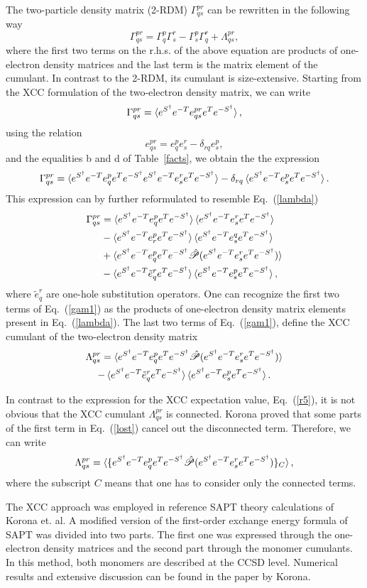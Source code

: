 \documentclass[preprint,12pt]{elsarticle}
\newcommand{\equ}[1]{\begin{equation} #1 \end{equation}}
\newcommand{\equl}[2]{\begin{equation}\label{#2} #1 \end{equation}}
\newcommand{\equml}[2]{\begin{multline}\label{#2} #1 \end{multline}}
\newcommand{\equsl}[2]{\begin{equation}\begin{split}\label{#2} #1 \end{split}\end{equation}}
\newcommand{\fr}[1]{Eq.~(\ref{#1})}
\newcommand{\Frt}[1]{Table~\ref{#1}}
\newcommand{\esd}{e^{S^\dagger}}
\newcommand{\esdm}{e^{-S^\dagger}}
\newcommand{\etm}{e^{-T}}
\newcommand{\et}{e^{T}}
\begin{document}
The two-particle density matrix (2-RDM)  $\Gamma^{pr}_{qs}$ can be rewritten in the following way \cite{kutzelnigg1997normal}
\equl{\Gamma^{pr}_{qs} =     \Gamma^p_q\Gamma^r_s - \Gamma^p_s\Gamma^r_q  +\Lambda^{pr}_{qs} ,
  }{lambda}
where  the first two terms on the r.h.s. of the above equation are products of  one-electron density
matrices and the last term is the matrix element of the cumulant.
In contrast
to the 2-RDM, its cumulant is size-extensive.\cite{kutzelnigg1997normal}
Starting from the XCC formulation of the two-electron density matrix,\cite{jeziorski1993explicitly} we can write
\equ{\Gamma^{pr}_{qs} = \braket{\esd\etm e^{pr}_{qs}\et\esdm},
}
 using the relation\cite{paldus1988clifford}
\equ{e^{pr}_{qs} = e^p_qe^r_s -\delta_{rq}e^p_s,
}
and the equalities b and d of \Frt{facts}, 
we obtain the the expression
\equ{ \Gamma^{pr}_{qs} = \braket{\esd\etm e^p_q\et\esdm\esd\etm e^r_s\et\esdm} - \delta_{rq}\braket{\esd\etm e^p_s \et\esdm}.
}
This expression can by further reformulated 
to resemble \fr {lambda}
\equsl{\Gamma^{pr}_{qs} &= \braket{\esd\etm e^p_q \et\esdm} \braket{\esd\etm e^r_s \et\esdm}\\ &-
  \braket{\esd\etm e^p_r \et\esdm}\braket{\esd\etm e^q_s\et\esdm} \\
  &+ \braket{\esd\etm e^p_q \et\esdm \hat{\mathscr{P}}(\esd\etm e^r_s \et\esdm)}\\
  &-\braket{\esd\etm \tilde{e}^r_q\et\esdm}\braket{\esd\etm e^p_s\et\esdm},
}{gam1}
where  $\tilde{e}^r_q$  are one-hole substitution operators.\cite{paldus1988clifford} 
One can recognize the first two terms of \fr{gam1} as the products of one-electron density matrix elements present in \fr{lambda}.
The last two terms of \fr{gam1}, define the XCC cumulant of the two-electron density matrix
\equml{\Lambda^{pr}_{qs} = \braket{\esd\etm e^p_q \et\esdm \hat{\mathscr{P}}(\esd\etm e^r_s \et\esdm)}\\
  -\braket{\esd\etm \tilde{e}^r_q\et\esdm}\braket{\esd\etm e^p_s\et\esdm}.
}{lost}

In contrast to the expression for the XCC expectation value,
\fr{r5}, it is not obvious that  the XCC cumulant $\Lambda^{pr}_{qs}$ is connected.
Korona proved\cite{korona2008two} that some parts of the first term in \fr{lost}
cancel out the disconnected term. Therefore, we can write
\equ{\Lambda^{pr}_{qs} = \braket{\{\esd\etm e^p_q \et\esdm \hat{\mathscr{P}}(\esd\etm e^r_s \et\esdm)\}_C},
}
where the subscript $C$ means that one has to consider only the connected terms. 

The XCC approach was employed in reference SAPT theory\cite{jeziorski1994perturbation, szalewicz2005intermolecular}
calculations of Korona et. al.\cite{korona2008first}
A modified version of the first-order exchange energy formula\cite{moszynski1994many} of SAPT was
divided into two parts. The first one was expressed through
the one-electron density matrices and the second part through the monomer cumulants.
In this method, both monomers are described  at the CCSD level. 
Numerical results and extensive discussion can be found in the paper by Korona.\cite{korona2008first}
\end{document}
